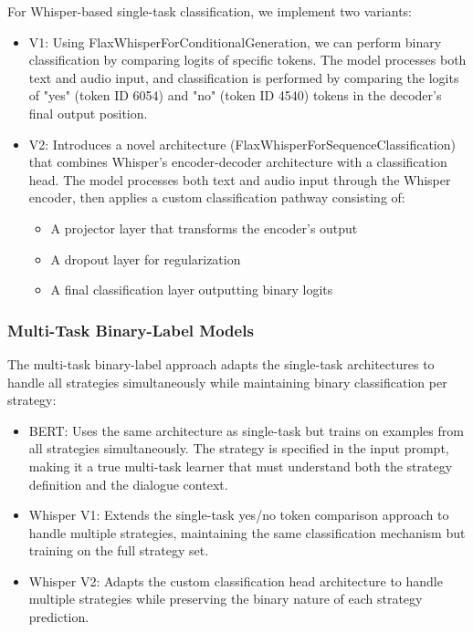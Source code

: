 \documentclass[10pt,twocolumn]{article}
\begin{document}
\noindent For Whisper-based single-task classification, we implement two variants:
\begin{itemize}
    \item V1: Using FlaxWhisperForConditionalGeneration, we can perform binary classification by comparing logits of specific tokens. The model processes both text and audio input, and classification is performed by comparing the logits of "yes" (token ID 6054) and "no" (token ID 4540) tokens in the decoder's final output position.
    
    \item V2: Introduces a novel architecture (FlaxWhisperForSequenceClassification) that combines Whisper's encoder-decoder architecture with a classification head. The model processes both text and audio input through the Whisper encoder, then applies a custom classification pathway consisting of: \begin{itemize}
        \item A projector layer that transforms the encoder's output
        \item A dropout layer for regularization
        \item A final classification layer outputting binary logits
    \end{itemize}
\end{itemize}

\subsubsection{Multi-Task Binary-Label Models}
The multi-task binary-label approach adapts the single-task architectures to handle all strategies simultaneously while maintaining binary classification per strategy:

\begin{itemize}
    \item BERT: Uses the same architecture as single-task but trains on examples from all strategies simultaneously. The strategy is specified in the input prompt, making it a true multi-task learner that must understand both the strategy definition and the dialogue context.
    
    \item Whisper V1: Extends the single-task yes/no token comparison approach to handle multiple strategies, maintaining the same classification mechanism but training on the full strategy set.
    
    \item Whisper V2: Adapts the custom classification head architecture to handle multiple strategies while preserving the binary nature of each strategy prediction.
\end{itemize}
\end{document}
